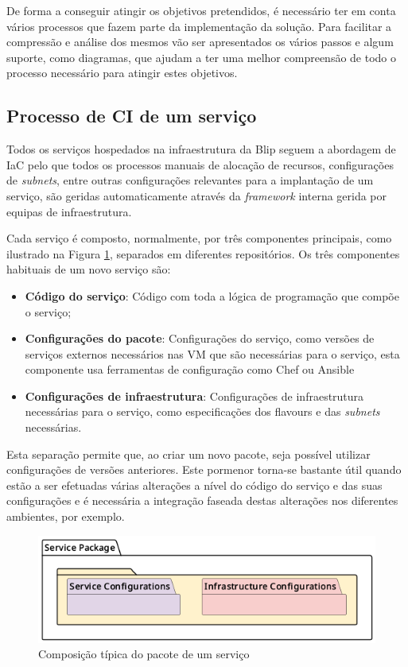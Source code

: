 De forma a conseguir atingir os objetivos pretendidos, é necessário ter em conta vários processos
que fazem parte da implementação da solução. Para facilitar a compressão e análise dos mesmos vão 
ser apresentados os vários passos e algum suporte, como diagramas, que ajudam a ter uma melhor 
compreensão de todo o processo necessário para atingir estes objetivos.

\subsection{Processo de \ac{CI} de um serviço}

Todos os serviços hospedados na infraestrutura da Blip seguem a abordagem de \ac{IaC} pelo que 
todos os processos manuais de alocação de recursos, configurações de \textit{subnets}, entre 
outras configurações relevantes para a implantação de um serviço, são geridas automaticamente
através da \textit{framework} interna gerida por equipas de infraestrutura.

Cada serviço é composto, normalmente, por três componentes principais, como ilustrado na Figura
\ref{package}, separados em diferentes repositórios. Os três componentes habituais de um novo 
serviço são: 

\begin{itemize}
  \item \textbf{Código do serviço}: Código com toda a lógica de programação que compõe o serviço;
  \item \textbf{Configurações do pacote}: Configurações do serviço, como versões de serviços 
  externos necessários nas \ac{VM} que são necessárias para o serviço, esta componente usa 
ferramentas de configuração como Chef \cite{chef} ou Ansible \cite{ansible} 
  \item \textbf{Configurações de infraestrutura}: Configurações de infraestrutura necessárias para 
    o serviço, como especificações dos \glspl{flavour} e das \textit{subnets} necessárias.
\end{itemize}

Esta separação permite que, ao criar um novo pacote, seja possível utilizar configurações de
versões anteriores. Este pormenor torna-se bastante útil quando estão a ser efetuadas várias
alterações a nível do código do serviço e das suas configurações e é necessária a integração 
faseada destas alterações nos diferentes ambientes, por exemplo.

\begin{figure}[H]
  \centerline{\includegraphics[scale=0.5]{media/content/impl/service-composition.png}}
  \caption{Composição típica do pacote de um serviço}
  \label{package}
\end{figure}

